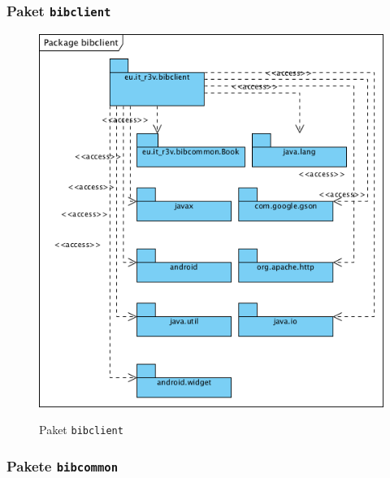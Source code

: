 \documentclass[fontsize=12pt,paper=a4,twoside]{scrartcl}
\begin{document}
\subsubsection{Paket \texttt{bibclient}}
\label{sec:bibclient}

\begin{figure} [H] 
\caption{Paket \texttt{bibclient}} \centering
	\includegraphics[width=1\textwidth]{Diagramme/Packagebibclient.png} 
	\label{pic:PackageClient} 
\end{figure}


\subsubsection{Pakete \texttt{bibcommon}}
\label{sec:bibcommon}
\end{document}
